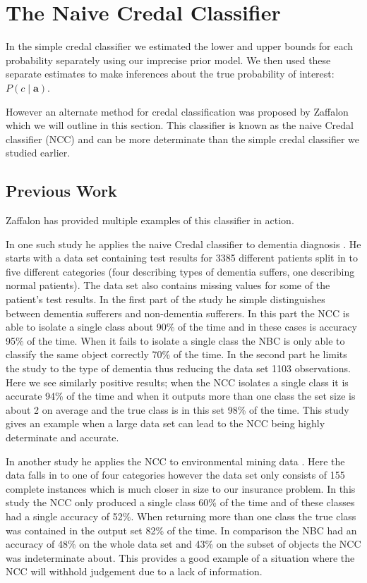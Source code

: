 \chapter{The Naive Credal Classifier}

In the simple credal classifier we estimated the lower and upper bounds for each probability separately using our imprecise prior model.
We then used these separate estimates to make inferences about the true probability of interest: $P(c \mid \mathbf{a})$.

However an alternate method for credal classification was proposed by Zaffalon \cite{Zaffalon01} which we will outline in this section.
This classifier is known as the naive Credal classifier (NCC) and can be more determinate than the simple credal classifier we studied earlier.

\section{Previous Work}

Zaffalon has provided multiple examples of this classifier in action.

In one such study he applies the naive Credal classifier to dementia diagnosis \cite{Zaffalon03}.
He starts with a data set containing test results for 3385 different patients split in to five different categories (four describing types of dementia suffers, one describing normal patients).
The data set also contains missing values for some of the patient's test results.
In the first part of the study he simple distinguishes between dementia sufferers and non-dementia sufferers.
In this part the NCC is able to isolate a single class about 90\% of the time and in these cases is accuracy 95\% of the time.
When it fails to isolate a single class the NBC is only able to classify the same object correctly 70\% of the time.
In the second part he limits the study to the type of dementia thus reducing the data set  1103 observations.
Here we see similarly positive results; when the NCC isolates a single class it is accurate 94\% of the time and when it outputs more than one class the set size is about 2 on average and the true class is in this set 98\% of the time.
This study gives an example when a large data set can lead to the NCC being highly determinate and accurate.

In another study he applies the NCC to environmental mining data \cite{Zaffalon02}.
Here the data falls in to one of four categories however the data set only consists of 155 complete instances which is much closer in size to our insurance problem.
In this study the NCC only produced a single class 60\% of the time and of these classes had a single accuracy of 52\%.
When returning more than one class the true class was contained in the output set 82\% of the time.
In comparison the NBC had an accuracy of 48\% on the whole data set and 43\% on the subset of objects the NCC was indeterminate about.
This provides a good example of a situation where the NCC will withhold judgement due to a lack of information.

